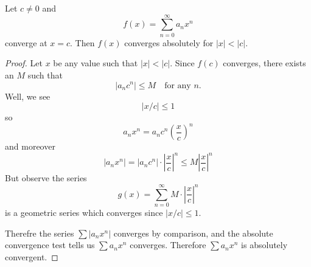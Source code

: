 Let $c\not=0$ and 
\begin{equation}
f(x)=\sum^{\infty}_{n=0}a_{n}x^{n}
\end{equation}
converge at $x=c$. Then $f(x)$ converges absolutely for
$|x|<|c|$.

\begin{proof}
Let $x$ be any value such that $|x|<|c|$. Since $f(c)$ converges,
there exists an $M$ such that
\begin{equation}
|a_{n}c^{n}|\leq M\quad\mbox{for any }n.
\end{equation}
Well, we see
\begin{equation}
|x/c|\leq 1
\end{equation}
so
\begin{equation}
a_{n}x^{n}=a_{n}c^{n}\left(\frac{x}{c}\right)^{n}
\end{equation}
and moreover
\begin{equation}
|a_{n}x^{n}| = |a_{n}c^{n}|\cdot\left|\frac{x}{c}\right|^{n}\leq M\left|\frac{x}{c}\right|^{n}
\end{equation}
But observe the series
\begin{equation}
g(x)=\sum^{\infty}_{n=0}M\cdot\left|\frac{x}{c}\right|^{n}
\end{equation}
is a geometric series which converges since $|x/c|\leq1$.

Therefre the series $\sum|a_{n}x^{n}|$ converges by comparison,
and the absolute convergence test tells us $\sum a_{n}x^{n}$
converges. Therefore $\sum a_{n}x^{n}$ is absolutely convergent.
\end{proof}


